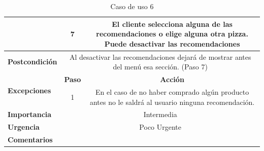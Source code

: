 \documentclass[conference]{IEEEtran}
\begin{document}
\begin{table}[H]
\begin{adjustbox}{width=0.45\textwidth}
\begin{tabular}{|p{11.215em}|c|c|}
\cmidrule{2-3}    \multicolumn{1}{|c|}{} & 7     & \multicolumn{1}{p{32em}|}{El cliente selecciona alguna de las recomendaciones o elige alguna otra pizza. Puede desactivar las recomendaciones} \\
    \midrule
    \textbf{Postcondición} & \multicolumn{2}{p{37.355em}|}{Al desactivar las recomendaciones dejará de mostrar antes del menú esa sección. (Paso 7)} \\
    \midrule
    \multirow{3}[4]{*}{\textbf{Excepciones}} & \multicolumn{1}{p{5.355em}|}{\textbf{Paso}} & \multicolumn{1}{p{32em}|}{\textbf{Acción}} \\
\cmidrule{2-3}    \multicolumn{1}{|c|}{} & \multirow{2}[2]{*}{1} & \multicolumn{1}{c|}{\multirow{2}[2]{*}{En el caso de no haber comprado algún producto antes no le saldrá al usuario ninguna recomendación.}} \\
    \multicolumn{1}{|c|}{} &       &  \\
    \midrule
    \textbf{Importancia} & \multicolumn{2}{p{37.355em}|}{Intermedia} \\
    \midrule
    \textbf{Urgencia} & \multicolumn{2}{p{37.355em}|}{Poco Urgente} \\
    \midrule
    \textbf{Comentarios} & \multicolumn{2}{c|}{} \\
    \bottomrule
    \end{tabular}%
    \end{adjustbox}
    \vspace{0.2cm}
    \caption{Caso de uso 6}
  \label{tab:addlabel}%
\end{table}%
\end{document}
